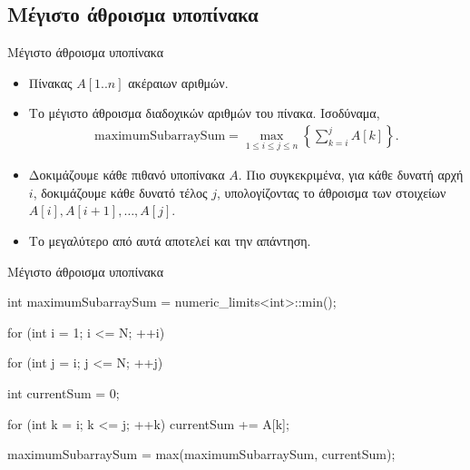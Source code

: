 \documentclass[t,aspectratio=169,9pt]{beamer}
\begin{document}
\subsection{Μέγιστο άθροισμα υποπίνακα}
\begin{frame}{Μέγιστο άθροισμα υποπίνακα}
    \begin{itemize}
        \pause
        \item Πίνακας $A[1..n]$ ακέραιων αριθμών.
    \end{itemize}
    \pause
    \begin{itemize}
        \pause
        \item Το μέγιστο άθροισμα διαδοχικών αριθμών του πίνακα. Ισοδύναμα, 
        \begin{align*}
            \text{maximumSubarraySum} = \max_{1 \leq i \leq j \leq n}\left\{\sum_{k = i}^{j} A[k]\right\}.
        \end{align*}
    \end{itemize}
    \pause
    \begin{itemize}
        \pause 
        \item Δοκιμάζουμε κάθε πιθανό υποπίνακα $A$. Πιο συγκεκριμένα, για κάθε δυνατή αρχή $i$, δοκιμάζουμε κάθε δυνατό τέλος $j$, υπολογίζοντας 
        το άθροισμα των στοιχείων $A[i], A[i + 1], \dots, A[j]$.
        \pause
        \item Το μεγαλύτερο από αυτά αποτελεί και την απάντηση.
    \end{itemize}
\end{frame}

\begin{frame}[fragile]{Μέγιστο άθροισμα υποπίνακα}
\begin{cpp}
int maximumSubarraySum = numeric_limits<int>::min();

for (int i = 1; i <= N; ++i)
{
    for (int j = i; j <= N; ++j)
    {
        int currentSum = 0;

        for (int k = i; k <= j; ++k)
        {
            currentSum += A[k];
        }

        maximumSubarraySum = max(maximumSubarraySum, currentSum);
    }
}
\end{cpp}
\end{frame}
\end{document}
